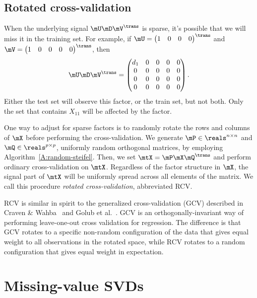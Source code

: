 \subsection{Rotated cross-validation}\label{SS:rotated-cv}

When the underlying signal $\mU \mD \mV^\trans$ is sparse, it's possible that we will miss it in the training set.  For example, if 
\(
    \mU 
    =
    \left(
    \begin{matrix}
        1 & 0 & 0 & 0
    \end{matrix}
    \right)^\trans
\)
and
\(
    \mV
    =
    \left(
    \begin{matrix}
        1 & 0 & 0 & 0 & 0
    \end{matrix}
    \right)^\trans
\),
then
\[
    \mU \mD \mV^\trans
    =
    \left(
    \begin{matrix}
        d_{1} & 0 & 0 & 0 & 0 \\
        0     & 0 & 0 & 0 & 0 \\
        0     & 0 & 0 & 0 & 0 \\
        0     & 0 & 0 & 0 & 0 
    \end{matrix}
    \right).
\]
Either the test set will observe this factor, or the train set, but not both.  Only the set that contains $X_{11}$ will be affected by the factor.

One way to adjust for sparse factors is to randomly rotate the rows and
columns of $\mX$ before performing the cross-validation. We generate $\mP \in
\reals^{n \times n}$ and $\mQ \in \reals^{p \times p}$, uniformly random
orthogonal matrices, by employing Algorithm~\ref{A:random-steifel}. Then, we
set $\mtX = \mP \mX \mQ^\trans$ and perform ordinary cross-validation on
$\mtX$. Regardless of the factor structure in $\mX$, the signal part of $\mtX$
will be uniformly spread across all elements of the matrix. We call this
procedure \emph{rotated cross-validation}, abbreviated RCV.  

RCV is similar in spirit to the generalized cross-validation (GCV) described
in Craven \& Wahba~\cite{craven1978smoothing} and Golub et
al.~\cite{golub1979generalized}. GCV is an orthogonally-invariant way of
performing leave-one-out cross validation for regression. The difference is
that GCV rotates to a specific non-random configuration of the data that gives
equal weight to all observations in the rotated space, while RCV rotates to a 
random configuration that gives equal weight in expectation.


\section{Missing-value SVDs}\label{S:missing-values-svds}


